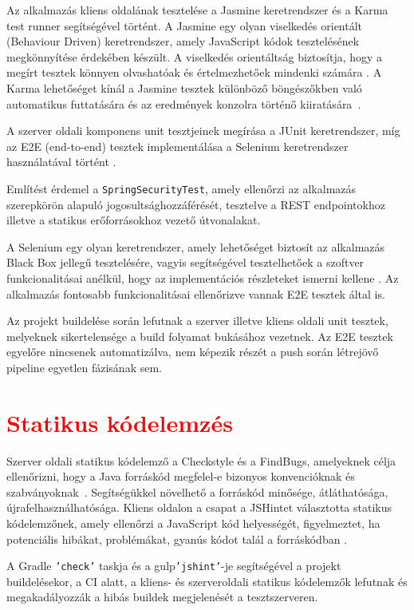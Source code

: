 Az alkalmazás kliens oldalának tesztelése a Jasmine keretrendszer és a Karma test runner segítségével történt. A Jasmine egy olyan viselkedés orientált (Behaviour Driven) keretrendszer, amely JavaScript kódok tesztelésének megkönnyítése érdekében készült. A viselkedés orientáltság biztosítja, hogy a megírt tesztek könnyen olvashatóak és értelmezhetőek mindenki számára \cite{Jasmine}. A Karma lehetőséget kínál a Jasmine tesztek különböző böngészőkben való automatikus futtatására és az eredmények konzolra történő kiiratására~\cite{KarmaJasmine}.

A szerver oldali komponens unit tesztjeinek megírása a JUnit keretrendszer, míg az E2E (end-to-end) tesztek implementálása a Selenium keretrendszer használatával történt \cite{Selenium}.  

Említést érdemel a \texttt{SpringSecurityTest}, amely ellenőrzi az alkalmazás szerepkörön alapuló jogosultsághozzáférését, tesztelve a REST endpointokhoz illetve a statikus erőforrásokhoz vezető útvonalakat. 

A Selenium egy olyan keretrendszer, amely lehetőséget biztosít az alkalmazás Black Box jellegű tesztelésére, vagyis segítségével tesztelhetőek a szoftver funkcionalitásai anélkül, hogy az implementációs részleteket ismerni kellene \cite{Selenium}. Az alkalmazás fontosabb funkcionalitásai ellenőrizve vannak E2E tesztek által is.

Az projekt buildelése során lefutnak a szerver illetve kliens oldali unit tesztek, melyeknek sikertelensége a build folyamat bukásához vezetnek. Az E2E tesztek egyelőre nincsenek automatizálva, nem képezik részét a push során létrejövő pipeline egyetlen fázisának sem. 


\section{\textcolor{red}{Statikus kódelemzés}}
\label{subsec:statikusKodElemzes}

Szerver oldali statikus kódelemző a Checkstyle és a FindBugs, amelyeknek célja ellenőrizni, hogy a Java forráskód megfelel-e bizonyos konvencióknak és szabványoknak~\cite{Checkstyle, FindBugs}. Segítségükkel növelhető a forráskód minősége, átláthatósága, újrafelhasználhatósága. 
Kliens oldalon a csapat a JSHintet választotta statikus kódelemzőnek, amely  ellenőrzi a JavaScript kód helyességét, figyelmeztet, ha potenciális hibákat, problémákat, gyanús kódot talál a forráskódban \cite{JSHint}.

A Gradle \texttt{'check'} taskja és a gulp\texttt{'jshint'}-je segítségével a projekt buildelésekor, a CI alatt, a kliens- és szerveroldali statikus kódelemzők lefutnak és megakadályozzák a hibás buildek megjelenését a tesztszerveren. 


